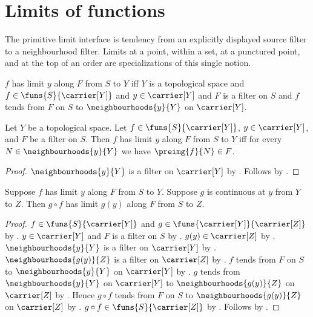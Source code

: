 \section{Limits of functions}




The primitive limit interface is tendency from an explicitly displayed
source filter to a neighbourhood filter.  Limits at a point, within a set,
at a punctured point, and at the top of an order are specializations of this
single notion.

\begin{definition}\label{function_has_limit_along}
    $f$ has limit $y$ along $F$ from $S$ to $Y$ iff
        $Y$ is a topological space and
        $f\in\funs{S}{\carrier[Y]}$ and
        $y\in\carrier[Y]$ and
        $F$ is a filter on $S$ and
        $f$ tends from $F$ on $S$ to
            $\neighbourhoods{y}{Y}$ on $\carrier[Y]$.
\end{definition}

\begin{theorem}\label{function_has_limit_along_iff_preimages}
    Let $Y$ be a topological space.
    Let $f\in\funs{S}{\carrier[Y]}$, $y\in\carrier[Y]$, and
        $F$ be a filter on $S$.
    Then $f$ has limit $y$ along $F$ from $S$ to $Y$ iff
        for every $N\in\neighbourhoods{y}{Y}$ we have
        $\preimg{f}{N}\in F$.
\end{theorem}
\begin{proof}
    $\neighbourhoods{y}{Y}$ is a filter on $\carrier[Y]$ by
        .
    Follows by
        .
\end{proof}

\begin{theorem}\label{continuous_at_preserves_function_limits}
    Suppose $f$ has limit $y$ along $F$ from $S$ to $Y$.
    Suppose $g$ is continuous at $y$ from $Y$ to $Z$.
    Then $g\circ f$ has limit $g(y)$ along $F$ from $S$ to $Z$.
\end{theorem}
\begin{proof}
    $f\in\funs{S}{\carrier[Y]}$ and
        $g\in\funs{\carrier[Y]}{\carrier[Z]}$ by
        .
    $y\in\carrier[Y]$ and $F$ is a filter on $S$ by
        .
    $g(y)\in\carrier[Z]$ by .
    $\neighbourhoods{y}{Y}$ is a filter on $\carrier[Y]$ by
        .
    $\neighbourhoods{g(y)}{Z}$ is a filter on $\carrier[Z]$ by
        .
    $f$ tends from $F$ on $S$ to
        $\neighbourhoods{y}{Y}$ on $\carrier[Y]$ by
        .
    $g$ tends from $\neighbourhoods{y}{Y}$ on $\carrier[Y]$ to
        $\neighbourhoods{g(y)}{Z}$ on $\carrier[Z]$ by
        .
    Hence $g\circ f$ tends from $F$ on $S$ to
        $\neighbourhoods{g(y)}{Z}$ on $\carrier[Z]$ by
        .
    $g\circ f\in\funs{S}{\carrier[Z]}$ by .
    Follows by .
\end{proof}

